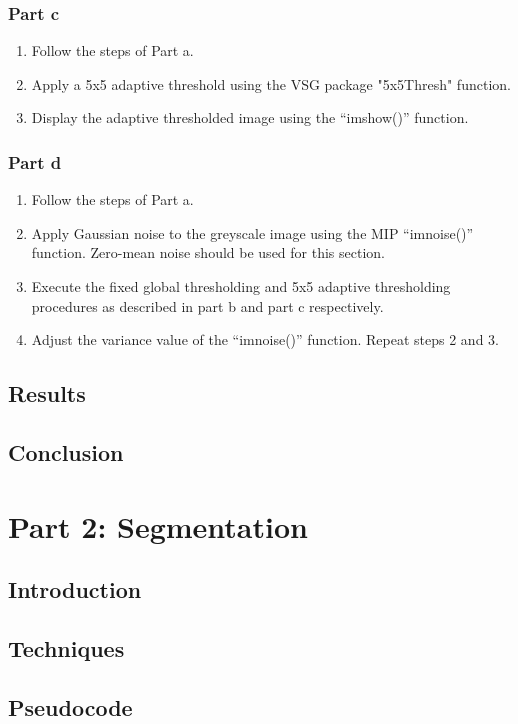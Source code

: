 \documentclass[a4paper]{article}
\begin{document}
	\subsubsection{Part c}
	\begin{enumerate}
		\item Follow the steps of Part a.
		\item Apply a 5x5 adaptive threshold using the VSG package
			"5x5Thresh" function.
		\item Display the adaptive thresholded image using the
			``imshow()'' function.
	\end{enumerate}
	\subsubsection{Part d}
	\begin{enumerate}
		\item Follow the steps of Part a.
		\item Apply Gaussian noise to the greyscale image using the MIP
			``imnoise()'' function. Zero-mean noise should be used
			for this section.
		\item Execute the fixed global thresholding and 5x5 adaptive
			thresholding procedures as described in part b and part
			c respectively.
		\item Adjust the variance value of the ``imnoise()'' function.
			Repeat steps 2 and 3.
	\end{enumerate}
	\subsection{Results}
	\subsection{Conclusion}
	\section{Part 2: Segmentation}
	\subsection{Introduction}
	\subsection{Techniques}
	\subsection{Pseudocode}
\end{document}
